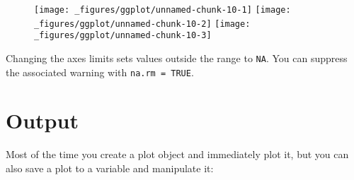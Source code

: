 \begin{Shaded}
\begin{Highlighting}[]
\OperatorTok{+}
\StringTok{  }\NormalTok{(} \NormalTok{)}

\OperatorTok{+}
\StringTok{  }\NormalTok{(} \NormalTok{) }\OperatorTok{+}\StringTok{ }
\StringTok{  }\NormalTok{(}\NormalTok{, }\NormalTok{) }\OperatorTok{+}\StringTok{ }
\StringTok{  }\NormalTok{(}\NormalTok{, }\NormalTok{)}
  
\OperatorTok{+}
\StringTok{  }\NormalTok{(} \NormalTok{, } \NormalTok{) }\OperatorTok{+}\StringTok{ }
\StringTok{  }\NormalTok{(}\NormalTok{, }\NormalTok{)}
\end{Highlighting}
\end{Shaded}

\begin{figure}[H]
  \texttt{[image: \_figures/ggplot/unnamed-chunk-10-1]}%
  \texttt{[image: \_figures/ggplot/unnamed-chunk-10-2]}%
  \texttt{[image: \_figures/ggplot/unnamed-chunk-10-3]}
\end{figure}

Changing the axes limits sets values outside the range to \texttt{NA}.
You can suppress the associated warning with \texttt{na.rm\ =\ TRUE}.

\hypertarget{sec:output}{%
\section{Output}\label{sec:output}}

Most of the time you create a plot object and immediately plot it, but
you can also save a plot to a variable and manipulate it:

\begin{Shaded}
\begin{Highlighting}[]
\StringTok{ } \OperatorTok{+}
\StringTok{  }\NormalTok{()}
\end{Highlighting}
\end{Shaded}

